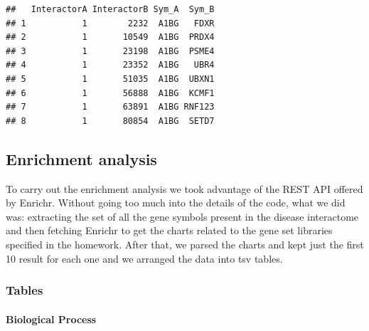 \documentclass[
]{article}
\begin{document}
\begin{verbatim}
##   InteractorA InteractorB Sym_A  Sym_B
## 1           1        2232  A1BG   FDXR
## 2           1       10549  A1BG  PRDX4
## 3           1       23198  A1BG  PSME4
## 4           1       23352  A1BG   UBR4
## 5           1       51035  A1BG  UBXN1
## 6           1       56888  A1BG  KCMF1
## 7           1       63891  A1BG RNF123
## 8           1       80854  A1BG  SETD7
\end{verbatim}

\hypertarget{enrichment-analysis}{%
\subsection{Enrichment analysis}\label{enrichment-analysis}}

To carry out the enrichment analysis we took advantage of the REST API
offered by Enrichr. Without going too much into the details of the code,
what we did was: extracting the set of all the gene symbols present in
the disease interactome and then fetching Enrichr to get the charts
related to the gene set libraries specified in the homework. After that,
we parsed the charts and kept just the first 10 result for each one and
we arranged the data into tsv tables.

\hypertarget{tables}{%
\subsubsection{Tables}\label{tables}}

\hypertarget{biological-process}{%
\paragraph{Biological Process}\label{biological-process}}
\end{document}
